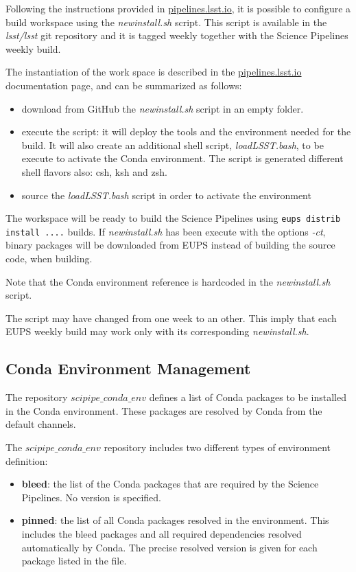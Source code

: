 Following the instructions provided in \url{pipelines.lsst.io}, it is possible to configure a build workspace using the \textit{newinstall.sh} script.
This script is available in the \textit{lsst/lsst} git repository and it is tagged weekly together with the Science Pipelines weekly build.

The instantiation of the work space is described in the \url{pipelines.lsst.io} documentation page, and can be summarized as follows:

\begin{itemize}
\item download from GitHub the \textit{newinstall.sh} script in an empty folder.
\item execute the script: it will deploy the tools and the environment needed for the build. It will also create an additional shell script, \textit{loadLSST.bash}, to be execute to activate the Conda environment. The script is generated different shell flavors also: csh, ksh and zsh.
\item source the \textit{loadLSST.bash} script in order to activate the environment 
\end{itemize}

The workspace will be ready to build the Science Pipelines using \texttt{eups distrib install ....} builds. If \textit{newinstall.sh} has been execute with the options \textit{-ct}, binary packages will be downloaded from EUPS instead of building the source code, when building.

Note that the Conda environment reference is hardcoded in the \textit{newinstall.sh} script.

The script may have changed from one week to an other.
This imply that each EUPS weekly build may work only with its corresponding \textit{newinstall.sh}.


\subsection{Conda Environment Management} \label{sec:condaenv}

The repository $scipipe\_conda\_env$ defines a list of Conda packages to be installed in the Conda environment.
These packages are resolved by Conda from the default channels.

The $scipipe\_conda\_env$ repository includes two different types of environment definition:

\begin{itemize}
\item {\bf bleed}: the list of the Conda packages that are required by the Science Pipelines. No version is specified.
\item {\bf pinned}: the list of all Conda packages resolved in the environment. This includes the bleed packages and all required dependencies resolved automatically by Conda. The precise resolved version is given for each package listed in the file.
\end{itemize}

